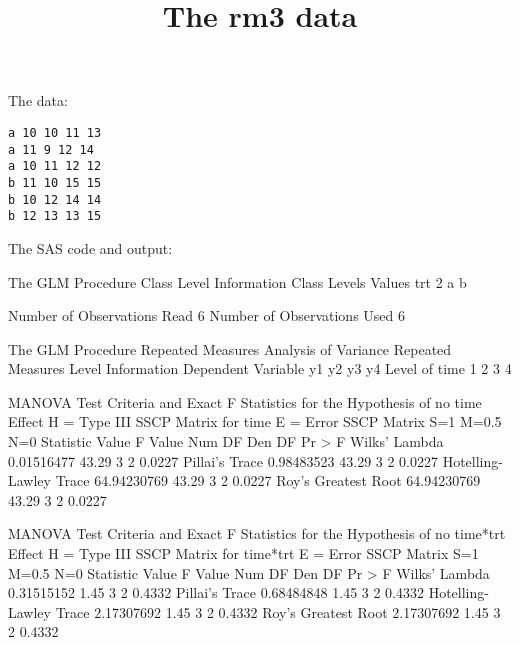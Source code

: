 \documentclass{article}
\title{The rm3 data}
\begin{document}
\maketitle
The data:
\begin{verbatim}
a 10 10 11 13
a 11 9 12 14
a 10 11 12 12
b 11 10 15 15
b 10 12 14 14
b 12 13 13 15
\end{verbatim}
The SAS code and output:
\begin{Woutput}
The GLM Procedure
   Class Level Information
Class         Levels    Values
trt                2    a b

Number of Observations Read           6
Number of Observations Used           6

The GLM Procedure
Repeated Measures Analysis of Variance
           Repeated Measures Level Information
Dependent Variable          y1       y2       y3       y4
     Level of time           1        2        3        4

                MANOVA Test Criteria and Exact F Statistics
                   for the Hypothesis of no time Effect
                     H = Type III SSCP Matrix for time
                           E = Error SSCP Matrix
                            S=1    M=0.5    N=0
Statistic                       Value   F Value   Num DF   Den DF   Pr > F
Wilks' Lambda              0.01516477     43.29        3        2   0.0227
Pillai's Trace             0.98483523     43.29        3        2   0.0227
Hotelling-Lawley Trace    64.94230769     43.29        3        2   0.0227
Roy's Greatest Root       64.94230769     43.29        3        2   0.0227

                MANOVA Test Criteria and Exact F Statistics
                 for the Hypothesis of no time*trt Effect
                   H = Type III SSCP Matrix for time*trt
                           E = Error SSCP Matrix
                            S=1    M=0.5    N=0
Statistic                       Value   F Value   Num DF   Den DF   Pr > F
Wilks' Lambda              0.31515152      1.45        3        2   0.4332
Pillai's Trace             0.68484848      1.45        3        2   0.4332
Hotelling-Lawley Trace     2.17307692      1.45        3        2   0.4332
Roy's Greatest Root        2.17307692      1.45        3        2   0.4332


\end{Woutput}
\end{document}
